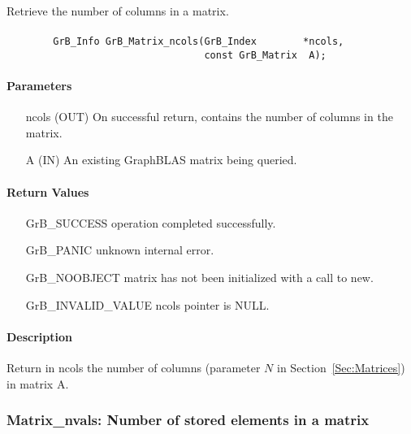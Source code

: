 Retrieve the number of columns in a matrix.

\paragraph{\syntax}

\begin{verbatim}
        GrB_Info GrB_Matrix_ncols(GrB_Index        *ncols,
                                  const GrB_Matrix  A);
\end{verbatim}

\paragraph{Parameters}

\begin{itemize}[leftmargin=1.1in]
    \item[{\sf ncols}] ({\sf OUT}) On successful return, contains the number of columns in the matrix.
    \item[{\sf A}] ({\sf IN}) An existing GraphBLAS matrix being queried.
\end{itemize}

\paragraph{Return Values}

\begin{itemize}[leftmargin=2.1in]
\item[{\sf GrB\_SUCCESS}]   operation completed successfully.
\item[{\sf GrB\_PANIC}]     unknown internal error.
\item[{\sf GrB\_NOOBJECT}]  matrix has not been initialized with a call to {\sf new}.
\item[{\sf GrB\_INVALID\_VALUE}]    {\sf ncols} pointer is {\sf NULL}.
\end{itemize}

\paragraph{Description}

Return in {\sf ncols} the number of columns (parameter $N$ in Section~\ref{Sec:Matrices}) in matrix {\sf A}.

\subsubsection{{\sf Matrix\_nvals}: Number of stored elements in a matrix}

